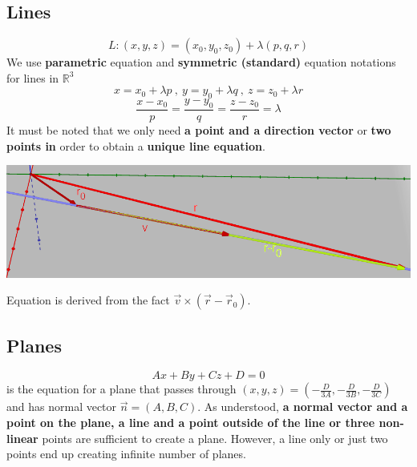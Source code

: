 \documentclass[12pt]{article}
\begin{document}
\subsection{Lines}
$$L: (x,y,z) = (x_0,y_0,z_0) + \lambda (p,q,r)$$
We use \textbf{parametric} equation and \textbf{symmetric (standard)} equation notations for lines in $\mathbb{R}^3$
\begin{equation}
	\tag{Parametric}
	x=x_0+\lambda p \ ,\  y=y_0 + \lambda q \ ,\  z=z_0+\lambda r
\end{equation}
\begin{equation}
	\tag{Standard}
	\frac{x-x_0}{p}=\frac{y-y_0}{q}=\frac{z-z_0}{r}= \lambda
\end{equation}
It must be noted that we only need \textbf{a point and a direction vector} or \textbf{two points in} order to obtain a \textbf{unique line equation}.

\includegraphics[scale=0.55]{line.png}

Equation is derived from the fact $\vec v \times (\vec r - \vec r_0)$.
\subsection{Planes}
$$Ax+By+Cz+D=0$$ is the equation for a plane that passes through $(x,y,z)=\left( -\frac{D}{3A},-\frac{D}{3B},-\frac{D}{3C}\right)$ and has normal vector $\vec n =(A,B,C)$. As understood, \textbf{a normal vector and a point on the plane, a line and a point outside of the line or three non-linear} points are sufficient to create a plane. However, a line only or just two points end up creating infinite number of planes.
\end{document}
